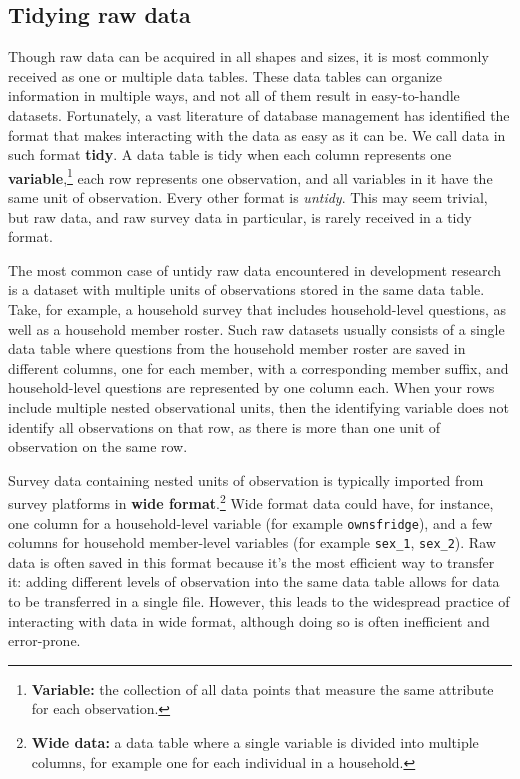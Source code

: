 \documentclass[
]{book}
\begin{document}
\hypertarget{tidying-raw-data}{%
\subsection*{Tidying raw data}\label{tidying-raw-data}}

Though raw data can be acquired in all shapes and sizes,
it is most commonly received as one or multiple data tables.
These data tables can organize information in multiple ways,
and not all of them result in easy-to-handle datasets.
Fortunately, a vast literature of database management has identified the format
that makes interacting with the data as easy as it can be.
We call data in such format \textbf{tidy}.
A data table is tidy when each column represents one \textbf{variable},\footnote{\textbf{Variable:} the collection of all data points
  that measure the same attribute for each observation.}
each row represents one observation,
and all variables in it have the same unit of observation.
Every other format is \emph{untidy}.
This may seem trivial, but raw data,
and raw survey data in particular,
is rarely received in a tidy format.

The most common case of untidy raw data encountered in development research
is a dataset with multiple units of observations stored in the same data table.
Take, for example, a household survey that includes household-level questions,
as well as a household member roster.
Such raw datasets usually consists of a single data table
where questions from the household member roster are saved in different columns,
one for each member, with a corresponding member suffix,
and household-level questions are represented by one column each.
When your rows include multiple nested observational units,
then the identifying variable does not identify all observations on that row,
as there is more than one unit of observation on the same row.

Survey data containing nested units of observation is typically
imported from survey platforms in \textbf{wide format}.\footnote{\textbf{Wide data:}
  a data table where a single variable is divided into multiple columns,
  for example one for each individual in a household.}
Wide format data could have, for instance,
one column for a household-level variable (for example \texttt{ownsfridge}),
and a few columns for household member-level variables (for example \texttt{sex\_1}, \texttt{sex\_2}).
Raw data is often saved in this format because it's the most efficient way to transfer it:
adding different levels of observation into the same data table
allows for data to be transferred in a single file.
However, this leads to the widespread practice of interacting with data in wide format,
although doing so is often inefficient and error-prone.
\end{document}
